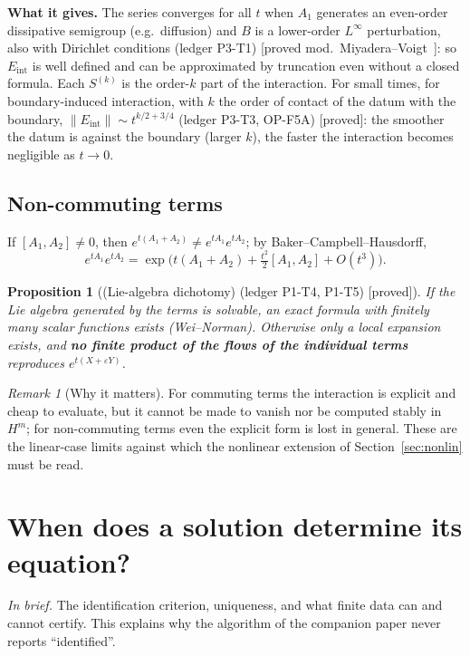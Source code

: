\documentclass[11pt]{article}
\theoremstyle{plain}
\newtheorem{proposition}[theorem]{Proposition}
\theoremstyle{definition}
\theoremstyle{remark}
\newtheorem{remark}[theorem]{Remark}
\newcommand{\Eint}{E_{\mathrm{int}}}        %
\newcommand{\inbrief}[1]{\par\smallskip\noindent\emph{In brief.} #1\par\smallskip}
\newcommand{\badge}[2]{\textcolor{#1}{\textsf{\footnotesize[#2]}}}
\newcommand{\proved}[1][]{\badge{cC}{proved#1}}
\newcommand{\modulo}[1]{\badge{cD}{proved mod.\ #1}}
\newcommand{\led}[1]{\textcolor{cG}{\textsf{\footnotesize(ledger #1)}}}
\newcommand{\edmark}[1]{}
\newenvironment{takeaway}{\begin{remark}[Why it matters]}{\end{remark}}
\begin{document}
\textbf{What it gives.} The series converges for all $t$ when $A_1$ generates an even-order dissipative semigroup (e.g.\ diffusion) and $B$ is a lower-order $L^\infty$ perturbation, also with Dirichlet conditions \led{P3-T1} \modulo{Miyadera--Voigt~\cite{en}}: so $\Eint$ is well defined and can be approximated by truncation even without a closed formula. Each $S^{(k)}$ is the order-$k$ part of the interaction. For small times, for boundary-induced interaction, with $k$ the order of contact of the datum with the boundary, $\|\Eint\|\sim t^{k/2+3/4}$ \led{P3-T3, OP-F5A} \proved\edmark{E10}: the smoother the datum is against the boundary (larger $k$), the faster the interaction becomes negligible as $t\to0$.

\subsection{Non-commuting terms}\label{sec:noncomm}
If $[A_1,A_2]\ne0$, then $e^{t(A_1+A_2)}\neq e^{tA_1}e^{tA_2}$; by Baker--Campbell--Hausdorff,
\[
e^{tA_1}e^{tA_2}=\exp\!\Big(t(A_1+A_2)+\tfrac{t^2}{2}[A_1,A_2]+O(t^3)\Big).
\]
\begin{proposition}[{(Lie-algebra dichotomy) \led{P1-T4, P1-T5} \proved[]}]\label{thm:lie}
If the Lie algebra generated by the terms is solvable, an exact formula with finitely many scalar functions exists (Wei--Norman). Otherwise only a local expansion exists, and \textbf{no finite product of the flows of the individual terms} reproduces $e^{t(X+\varepsilon Y)}$.
\end{proposition}
\begin{takeaway}
For commuting terms the interaction is explicit and cheap to evaluate, but it cannot be made to vanish nor be computed stably in $H^m$; for non-commuting terms even the explicit form is lost in general. These are the linear-case limits against which the nonlinear extension of Section~\ref{sec:nonlin} must be read.
\end{takeaway}




\section{When does a solution determine its equation?}\label{sec:identify}\label{ch:ident}
\inbrief{The identification criterion, uniqueness, and what finite data can and cannot certify. This explains why the algorithm of the companion paper never reports ``identified''.}
\end{document}
